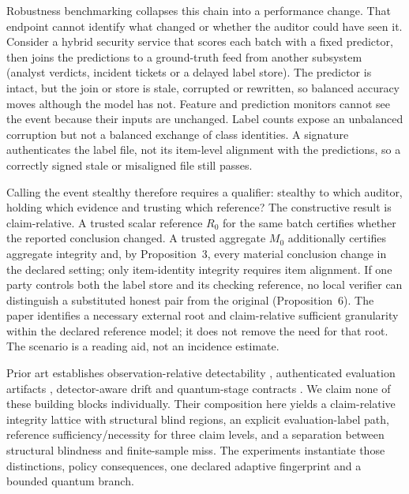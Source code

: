 \documentclass[10pt,journal,compsoc]{IEEEtran}
\begin{document}
Robustness benchmarking collapses this chain into a performance change. That
endpoint cannot identify what changed or whether the auditor could have seen
it. Consider a hybrid security service that scores each batch with a fixed
predictor, then joins the predictions to a ground-truth feed from another
subsystem (analyst verdicts, incident tickets or a delayed label store). The
predictor is intact, but the join or store is stale, corrupted or rewritten,
so balanced accuracy moves although the model has not. Feature and prediction
monitors cannot see the event because their inputs are unchanged. Label counts
expose an unbalanced corruption but not a balanced exchange of class identities.
A signature authenticates the label file, not its item-level alignment with the
predictions, so a correctly signed stale or misaligned file still passes.

Calling the event stealthy therefore requires a qualifier: stealthy to which
auditor, holding which evidence and trusting which reference? The constructive
result is claim-relative. A trusted scalar reference $R_0$ for the same batch
certifies whether the reported conclusion changed. A trusted aggregate
$M_0$ additionally certifies aggregate integrity and, by Proposition~3, every
material conclusion change in the declared setting; only item-identity
integrity requires item alignment. If one party
controls both the label store and its checking reference, no local verifier can
distinguish a substituted honest pair from the original (Proposition~6). The
paper identifies a necessary external root and claim-relative sufficient
granularity within the declared reference model; it does not remove the need
for that root. The scenario is a
reading aid, not an incidence estimate.

Prior art establishes observation-relative detectability
\cite{Pasqualetti2013,Teixeira2015,Liu2011}, authenticated evaluation artifacts
\cite{Stokes2021}, detector-aware drift \cite{Hinder2025} and quantum-stage
contracts \cite{YeniarasKarimov2026,Yeniaras2026PipeGuard}. We claim none of
these building blocks individually. Their composition here yields a
claim-relative integrity lattice with structural blind regions, an explicit
evaluation-label path, reference sufficiency/necessity for three claim levels,
and a separation between structural blindness and finite-sample miss. The
experiments instantiate those distinctions, policy consequences, one declared
adaptive fingerprint and a bounded quantum branch.
\end{document}
